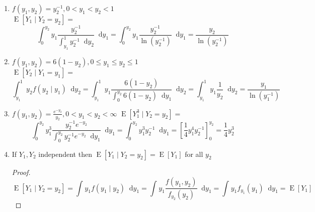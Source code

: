 \documentclass{article}
\newcommand{\expt}[1]{\operatorname{E}[#1]}
\newcommand*\diff{\mathop{}\!\mathrm{d}}
\newcommand{\intv}[4]{\int_{#3}^{#4} #1 \diff #2}
\begin{document}
\begin{enumerate}
  \item $f(y_1, y_2) = y_2^{-1}, 0 < y_1 < y_2 < 1$\\
  $\expt{Y_1 \mid Y_2 = y_2} = $\[
    \intv{ y_1\frac{y_2^{-1}}{\intv{ y_2^{-1} }{y_2}{y_1}{1}} }{y_1}{0}{y_2}
    = \intv{ y_1\frac{y_2^{-1}}{\ln (y_2^{-1})} }{y_1}{0}{y_2}
    = \frac{y_2}{\ln(y_2^{-1})}
  \]
  \item $f(y_1, y_2) = 6(1-y_2), 0 \leq y_1 \leq y_2 \leq 1$\\
  $\expt{Y_2 \mid Y_1 = y_1} = $\[
    \intv{y_2 f(y_2 \mid y_1) }{y_2}{y_1}{1}
    = \intv{y_1 \frac{6(1-y_2)}{ \intv{6(1-y_2)}{y_1}{0}{y_2} } }{y_2}{y_1}{1}
    = \intv{y_1 \frac{1}{y_2 } }{y_2}{y_1}{1}
    = \frac{y_1}{\ln(y_1^{-1})}
  \]

  \item $f(y_1, y_2) = \frac{e^{-y_2}}{y_2}, 0 < y_1 < y_2 < \infty$
  $\expt{Y_1^3 \mid Y_2 = y_2} = $ \[
    \intv{ y_1^3 \frac{y_2^{-1}e^{-y_2}}{ \intv{ y_2^{-1}e^{-y_2} }{y_1}{0}{y_2}} }{y_1}{0}{y_2}
    = \intv{ y_1^3 y_2^{-1} }{y_1}{0}{y_2}
    = \left[\frac{1}{4}y_1^4 y_2^{-1}\right]_{0}^{y_2} = \frac{1}{4}y_2^3
  \]

  \item If $Y_1, Y_2$ independent then $\expt{Y_1 \mid Y_2 = y_2} = \expt{Y_1}$ for all $y_2$
  \begin{proof}
    \[
      \expt{Y_1 \mid Y_2 = y_2} = \intv{ y_1 f(y_1 \mid y_2) }{y_1}{}{}
      = \intv{ y_1 \frac{f(y_1, y_2)}{f_{y_2}(y_2)} }{y_1}{}{}
      = \intv{ y_1 f_{y_1}(y_1) }{y_1}{}{}
      = \expt{Y_1}
    \]
  \end{proof}
\end{enumerate}
\end{document}
